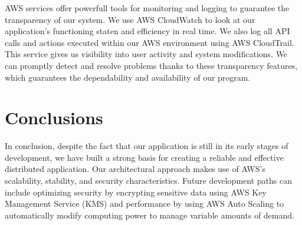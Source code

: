 \documentclass{article}
\begin{document}
\hspace{1cm}AWS services offer powerfull tools for monitoring and logging to guarantee the transparency of our system. We use AWS CloudWatch to look at our application's functioning staten and efficiency in real time. We also log all API calls and actions executed within our AWS environment using AWS CloudTrail. This service gives us visibility into user activity and system modifications. We can promptly detect and resolve problems thanks to these transparency features, which guarantees the dependability and availability of our program.

\section{Conclusions}

\hspace{1cm}In conclusion, despite the fact that our application is still in its early stages of development, we have built a strong basis for creating a reliable and effective distributed application. Our architectural approach makes use of AWS's scalability, stability, and security characteristics. Future development paths can include optimizing security by encrypting sensitive data using AWS Key Management Service (KMS) and performance by using AWS Auto Scaling to automatically modify computing power to manage variable amounts of demand.
\end{document}
